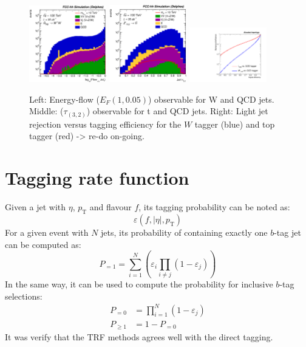 \documentclass[a4paper,11pt]{article}
\newcommand{\pt}{\ensuremath{p_{\text{T}}}}
\begin{document}
\begin{figure}[!htbp]\centering
\includegraphics[width=0.3\textwidth]{Fig/TMVA/Jet1_Flow15_sel0_nostack_logx.eps}
\includegraphics[width=0.3\textwidth]{Fig/TMVA/Jet1_tau32_sel0_nostack_log.eps}
\includegraphics[width=0.3\textwidth]{Fig/TMVA/effQCD_vs_effWhadBlue_thadRed_log.pdf}
\caption{Left: Energy-flow ($E_{F}(1,0.05)$) observable for W and QCD jets. Middle: ($\tau_(3,2)$) observable for t and QCD jets. Right: Light jet rejection versus tagging efficiency for the $W$ tagger (blue) and top tagger (red) -> re-do on-going.}
\label{fig:TMVA_final_result}
\end{figure}


\section{Tagging rate function}%
\label{sec:app:trf}
Given a jet with $\eta$, $\pt$ and flavour $f$, its tagging probability can be noted as:
\begin{equation*}
	\varepsilon \left(f,|\eta|,\pt\right)
\end{equation*}
\newline
For a given event with $N$ jets, its probability of containing exactly one $b$-tag jet can be computed as:
\begin{equation*}
	P_{=1} = \sum\limits_{i=1}^N \left( \varepsilon_{i} \prod\limits_{i \neq j} \left( 1 - \varepsilon_{j} \right) \right)
\end{equation*}
\newline
In the same way, it can be used to compute the probability for inclusive $b$-tag selections:
\begin{align*}
	P_{=0} &= \prod\limits_{i=1}^N \left( 1 - \varepsilon_{j} \right) \\
	P_{\geq 1} &= 1 - P_{=0}
\end{align*}
\newline
It was verify that the TRF methods agrees well with the direct tagging.
\end{document}
